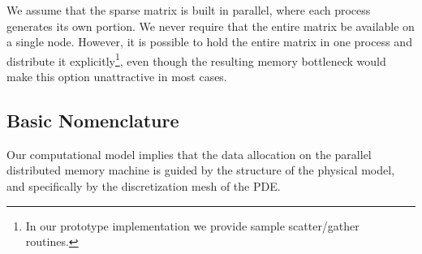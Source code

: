We assume that the sparse matrix is built in parallel, where each
process generates its own portion. We never require that the entire
matrix be available on a single node. However, it is possible
to hold the entire matrix in one process and distribute it
explicitly\footnote{In our prototype implementation  we provide 
sample scatter/gather routines.}, even though  the resulting memory 
bottleneck would make this option unattractive in most  cases. 


\subsection{Basic Nomenclature}


Our computational model implies that the data allocation on the
parallel distributed memory machine is guided by the structure of the
physical model, and specifically by the discretization mesh of the
PDE. 

